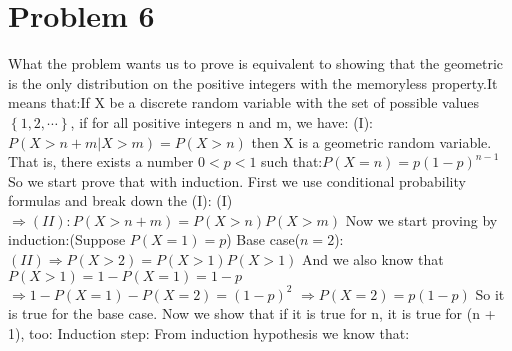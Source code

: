 \documentclass[12pt]{article}
\begin{document}
\section*{Problem 6} What the problem wants us to prove is equivalent to
showing that the geometric is the only distribution on the positive integers
with the memoryless property.It means that:\newline \newline If X be a discrete
random variable with the set of possible values $\left\{ 1,2,\cdots \right\}$,
if for all positive integers n and m, we have: \newline \newline (I): $P(X>n+m
    | X>m)=P(X>n)$ \newline \newline then X is a geometric random variable. That
is, there exists a number $0<p<1$ such that:\newline \newline $P (X = n) = p(1
    - p)^{n-1}$ \newline \newline So we start prove that with induction. \newline
First we use conditional probability formulas and break down the (I): \newline
\newline (I) $\Rightarrow (II): P(X>n+m)=P(X>n)P(X>m) $ \newline Now we start
proving by induction:(Suppose $P (X = 1) = p$) \newline Base case($n = 2$):
\newline $(II) \Rightarrow P (X > 2) = P (X > 1)P (X > 1)$ \newline And we also
know that $P(X>1) = 1 - P (X = 1) = 1 - p$ \newline \newline $\Rightarrow 1 - P
    (X = 1) - P (X = 2) = (1 - p)^{2}$ \newline \newline $\Rightarrow P (X = 2) =
    p(1 - p)$ \newline \newline So it is true for the base case. \newline Now we
show that if it is true for n, it is true for (n + 1), too: \newline \newline
Induction step: \newline From induction hypothesis we know that: \newline
\end{document}
